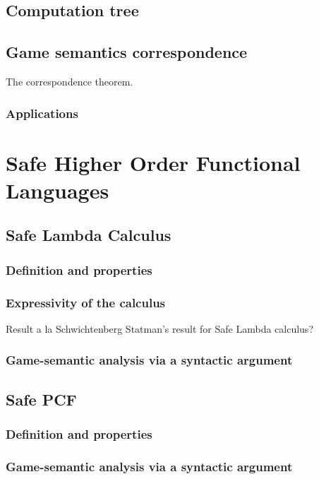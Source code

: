     \section{Computation tree}
    \section{Game semantics correspondence}
    The correspondence theorem.
    \subsection{Applications}



\chapter{Safe Higher Order Functional Languages}

    \section{Safe Lambda Calculus}
        \subsection{Definition and properties}
        \subsection{Expressivity of the calculus}
        Result a la Schwichtenberg \cite{citeulike:622637}
        Statman's result for Safe Lambda calculus?

        \subsection{Game-semantic analysis via a syntactic argument}
    \section{Safe PCF}
        \subsection{Definition and properties}
        \subsection{Game-semantic analysis via a syntactic argument}

